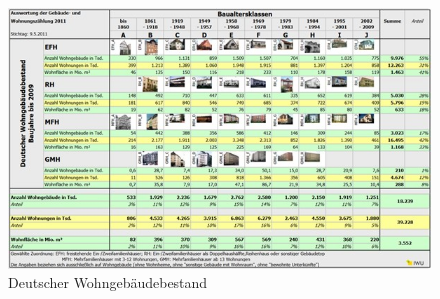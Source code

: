 \begin{figure}[h!]
    \centering
    \includegraphics[width=14cm]{Abbildungen/VerbraucherAbb2.jpg}
    \caption{Deutscher Wohngebäudebestand}\label{fig:Deutscher_Wohngebäudebestand}
\end{figure}

